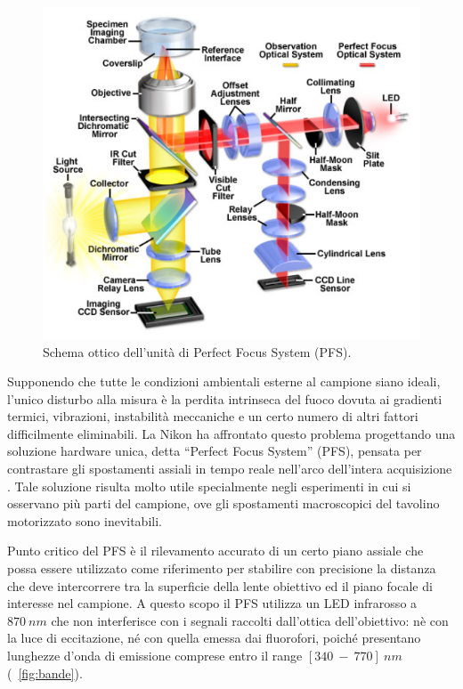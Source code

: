 \begin{figure}[h]
 \centering
 \includegraphics[scale=.65]{img/CAP2PFSschema.png}
 \caption{\small{Schema ottico dell'unità di Perfect Focus System (PFS).}}
 \label{fig:PFSschema}
\end{figure}

Supponendo che tutte le condizioni ambientali esterne al campione siano ideali, l'unico disturbo alla misura è la perdita intrinseca del fuoco dovuta ai gradienti termici, vibrazioni, instabilità meccaniche e un certo numero di altri fattori difficilmente eliminabili.
La Nikon ha affrontato questo problema progettando una soluzione hardware unica, detta ``Perfect Focus System'' (PFS), pensata per contrastare gli spostamenti assiali in tempo reale nell'arco dell'intera acquisizione \cite{Nikon2}. 
Tale soluzione risulta molto utile specialmente negli esperimenti in cui si osservano più parti del campione, ove gli spostamenti macroscopici del tavolino motorizzato sono inevitabili.

Punto critico del PFS è il rilevamento accurato di un certo piano assiale che possa essere utilizzato come riferimento per stabilire con precisione la distanza che deve intercorrere tra la superficie della lente obiettivo ed il piano focale di interesse nel campione. 
A questo scopo il PFS utilizza un LED infrarosso a $870\ nm$ che non interferisce con i segnali raccolti dall'ottica dell'obiettivo: nè con la luce di eccitazione, né con quella emessa dai fluorofori, poiché presentano lunghezze d'onda di emissione comprese entro il range $[340\ -\ 770]\ nm$ (\figurename~\ref{fig:bande}).

